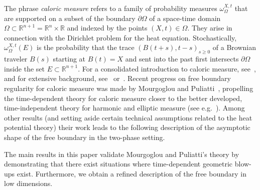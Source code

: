 \documentclass[AHL,Unicode,longabstracts,published]{cedram}
\makeatletter
\newcommand{\R}{\mathbb{R}}
\let\save@mathaccent\mathaccent
\newcommand*\if@single[3]{%
  \setbox0\hbox{${\mathaccent"0362{#1}}^H$}%
  \setbox2\hbox{${\mathaccent"0362{\kern0pt#1}}^H$}%
  \ifdim\ht0=\ht2 #3\else #2\fi
  }
\newcommand*\rel@kern[1]{\kern#1\dimexpr\macc@kerna}
\newcommand*\widebar[1]{\@ifnextchar^{{\wide@bar{#1}{0}}}{\wide@bar{#1}{1}}}
\newcommand*\wide@bar[2]{\if@single{#1}{\wide@bar@{#1}{#2}{1}}{\wide@bar@{#1}{#2}{2}}}
\newcommand*\wide@bar@[3]{%
  \begingroup
  \def\mathaccent##1##2{%
    \let\mathaccent\save@mathaccent
    \if#32 \let\macc@nucleus\first@char \fi
    \setbox\z@\hbox{$\macc@style{\macc@nucleus}_{}$}%
    \setbox\tw@\hbox{$\macc@style{\macc@nucleus}{}_{}$}%
    \dimen@\wd\tw@
    \advance\dimen@-\wd\z@
    \divide\dimen@ 3
    \@tempdima\wd\tw@
    \advance\@tempdima-\scriptspace
    \divide\@tempdima 10
    \advance\dimen@-\@tempdima
    \ifdim\dimen@>\z@ \dimen@0pt\fi
    \rel@kern{0.6}\kern-\dimen@
    \if#31
      \overline{\rel@kern{-0.6}\kern\dimen@\macc@nucleus\rel@kern{0.4}\kern\dimen@}%
      \advance\dimen@0.4\dimexpr\macc@kerna
      \let\final@kern#2%
      \ifdim\dimen@<\z@ \let\final@kern1\fi
      \if\final@kern1 \kern-\dimen@\fi
    \else
      \overline{\rel@kern{-0.6}\kern\dimen@#1}%
    \fi
  }%
  \macc@depth\@ne
  \let\math@bgroup\@empty \let\math@egroup\macc@set@skewchar
  \mathsurround\z@ \frozen@everymath{\mathgroup\macc@group\relax}%
  \macc@set@skewchar\relax
  \let\mathaccentV\macc@nested@a
  \if#31
    \macc@nested@a\relax111{#1}%
  \else
    \def\gobble@till@marker##1\endmarker{}%
    \futurelet\first@char\gobble@till@marker#1\endmarker
    \ifcat\noexpand\first@char A\else
      \def\first@char{}%
    \fi
    \macc@nested@a\relax111{\first@char}%
  \fi
  \endgroup
}
\let\oldbar\bar
\renewcommand*{\bar}[1]{{\mathchoice{\widebar{#1}}{\widebar{#1}}{\widebar{#1}}{\oldbar{#1}}}}
\renewcommand*{\to}{\mathchoice{\longrightarrow}{\rightarrow}{\rightarrow}{\rightarrow}}
\newcommand{\R}{\mathbb{R}}
\makeatother
\begin{document}
The phrase \emph{caloric measure} refers to a family of probability measures $\omega^{X,t}_\Omega$ that are supported on a subset of the boundary $\partial\Omega$ of a space-time domain $\Omega\subset \R^{n+1}=\R^{n}\times\R$ and indexed by the points $(X,t)\in\Omega$. They arise in connection with the Dirichlet problem for the heat equation. Stochastically, $\omega^{X,t}_\Omega(E)$ is the probability that the trace $(B(t+s),t-s)_{s\geq 0}$ of a Brownian traveler $B(s)$ starting at $B(t)=X$ and sent into the past first intersects $\partial\Omega$ inside the set $E\subset\R^{n+1}$. For a consolidated introduction to caloric measure, see~\cite[Section~3]{dim-caloric}, and for extensive background, see~\cite{Watson} or~\cite{Doob}. Recent progress on free boundary regularity for caloric measure was made by Mourgoglou and Puliatti~\cite{MP21}, propelling the time-dependent theory for caloric measure closer to the better developed, time-independent theory for harmonic and elliptic measure (see e.g.~\cite{AM19,BETnu,KPT}). Among other results (and setting aside certain technical assumptions related to the heat potential theory) their work leads to the following description of the asymptotic shape of the free boundary in the two-phase setting.


The main results in this paper validate Mourgoglou and Puliatti's theory by {demonstrating that there exist situations where time-dependent geometric blow-ups exist}. Furthermore, we obtain a refined description of the free boundary in low dimensions.
\end{document}
